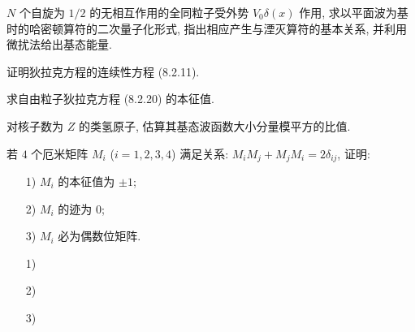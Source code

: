 \documentclass{assignment}
\begin{document}
\begin{prob}
    $N$ 个自旋为 $1/2$ 的无相互作用的全同粒子受外势 $V_0\delta(x)$ 作用, 求以平面波为基时的哈密顿算符的二次量子化形式, 指出相应产生与湮灭算符的基本关系, 并利用微扰法给出基态能量.
\end{prob}
\begin{sol}
    
\end{sol}

\begin{prob}[课本习题 8.10]
    证明狄拉克方程的连续性方程 (8.2.11).
\end{prob}
\begin{pf}
    
\end{pf}

\begin{prob}[课本习题 8.11]
    求自由粒子狄拉克方程 (8.2.20) 的本征值.
\end{prob}
\begin{sol}
    
\end{sol}

\begin{prob}
    对核子数为 $Z$ 的类氢原子, 估算其基态波函数大小分量模平方的比值.
\end{prob}
\begin{sol}
    
\end{sol}

\begin{prob}
    若 $4$ 个厄米矩阵 $M_i$ ($i=1,2,3,4$) 满足关系: $M_iM_j+M_jM_i=2\delta_{ij}$, 证明:
    \begin{itemize}
        \item[1)] $M_i$ 的本征值为 $\pm 1$;
        \item[2)] $M_i$ 的迹为 $0$;
        \item[3)] $M_i$ 必为偶数位矩阵.
    \end{itemize}
\end{prob}
\begin{pf}
    \begin{itemize}
        \item[1)] 
        \item[2)] 
        \item[3)] 
    \end{itemize}
\end{pf}
\end{document}
